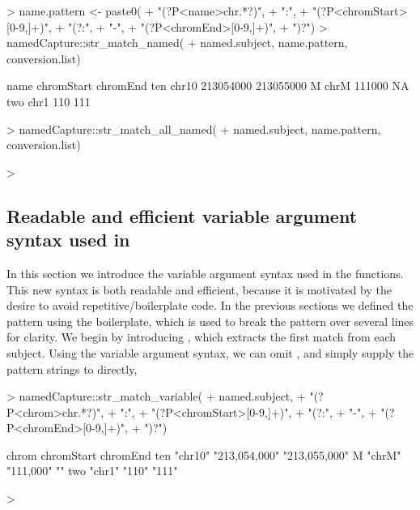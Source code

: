 \begin{Schunk}
\begin{Sinput}
> name.pattern <- paste0(
+   "(?P<name>chr.*?)",
+   ":",
+   "(?P<chromStart>[0-9,]+)",
+   "(?:",
+     "-",
+     "(?P<chromEnd>[0-9,]+)",
+   ")?")
> namedCapture::str_match_named(
+   named.subject, name.pattern, conversion.list)
\end{Sinput}
\begin{Soutput}
     name chromStart  chromEnd
ten chr10  213054000 213055000
M    chrM     111000        NA
two  chr1        110       111
\end{Soutput}
\begin{Sinput}
> namedCapture::str_match_all_named(
+   named.subject, name.pattern, conversion.list)
\end{Sinput}
\begin{Sinput}
> 
\end{Sinput}
\end{Schunk}

\subsection{Readable and efficient variable argument syntax used in }

In this section we introduce the variable argument syntax used in the
 functions. This new syntax is both readable and
efficient, because it is motivated by the desire to avoid
repetitive/boilerplate code. In the previous sections we defined the
pattern using the  boilerplate, which is used to break the
pattern over several lines for clarity. We begin by introducing
, which extracts the first match from each
subject. Using the variable argument syntax, we can omit , and
simply supply the pattern strings to 
directly,

\begin{Schunk}
\begin{Sinput}
> namedCapture::str_match_variable(
+   named.subject, 
+   "(?P<chrom>chr.*?)",
+   ":",
+   "(?P<chromStart>[0-9,]+)",
+   "(?:",
+     "-",
+     "(?P<chromEnd>[0-9,]+)",
+   ")?")
\end{Sinput}
\begin{Soutput}
    chrom   chromStart    chromEnd     
ten "chr10" "213,054,000" "213,055,000"
M   "chrM"  "111,000"     ""           
two "chr1"  "110"         "111"        
\end{Soutput}
\begin{Sinput}
> 
\end{Sinput}
\end{Schunk}

